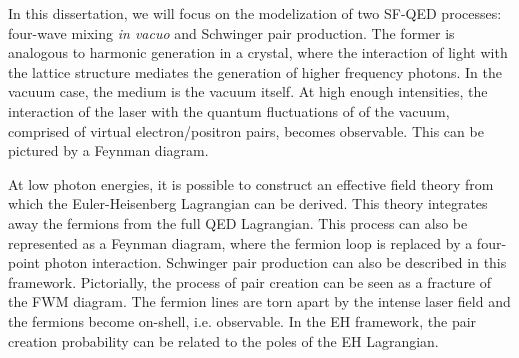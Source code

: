 \documentclass[11pt,SymmetricalJury]{inrsthesis/inrsthesis}
\begin{document}
In this dissertation, we will focus on the modelization of two SF-QED processes:
four-wave mixing \textit{in vacuo} and Schwinger pair production. The former is
analogous to harmonic generation in a crystal, where the interaction of light
with the lattice structure mediates the generation of higher frequency photons.
In the vacuum case, the medium is the vacuum itself. At high enough intensities,
the interaction of the laser with the quantum fluctuations of of the vacuum,
comprised of virtual electron/positron pairs, becomes observable. This can be
pictured by a Feynman diagram.


At low photon energies, it is possible to construct an effective field theory
from which the Euler-Heisenberg Lagrangian can be derived. This theory
integrates away the fermions from the full QED Lagrangian. This process can also
be represented as a Feynman diagram, where the fermion loop is replaced by a
four-point photon interaction. Schwinger pair production can also be described in
this framework. Pictorially, the process of pair creation can be seen as a
fracture of the FWM diagram. The fermion lines are torn apart by the intense
laser field and the fermions become on-shell, i.e. observable. In the EH framework,
the pair creation probability can be related to the poles of the EH Lagrangian.
\end{document}
